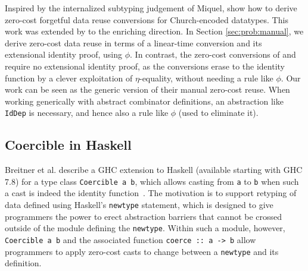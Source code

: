 \documentclass[acmsmall]{acmart}\settopmatter{}
\newcommand{\refsec}[1]{Section \ref{sec:#1}}
\newcommand{\labsec}[1]{\label{sec:#1}}
\begin{document}
Inspired by the internalized subtyping judgement of Miquel,
\citet{barras:implicit} show how to derive zero-cost forgetful data
reuse conversions for Church-encoded datatypes.
This work was extended by \citet{diehl} to the enriching direction.
In \refsec{prob:manual}, we derive zero-cost data reuse in terms of a
linear-time conversion and its extensional identity proof, using
$\phi$. In contrast, the zero-cost conversions of
\citet{barras:implicit} and \citet{diehl} require no extensional
identity proof, as the conversions erase to the identity function by a
clever exploitation of $\eta$-equality, without needing a rule like
$\phi$. Our work can be seen as the generic version of their manual
zero-cost reuse. When working generically with abstract combinator
definitions, an abstraction like \verb;IdDep; is necessary,
and hence also a rule like $\phi$ (used to eliminate it).



\subsection{Coercible in Haskell}
\labsec{others:hask}

Breitner et al. describe a GHC extension to Haskell (available
starting with GHC 7.8) for a type class \verb|Coercible a b|, which
allows casting from \verb|a| to \verb|b| when such a cast is indeed
the identity function~\cite{breitner+16}.  The motivation is to support retyping of data
defined using Haskell's \verb|newtype| statement, which is designed to
give programmers the power to erect abstraction barriers that cannot
be crossed outside of the module defining the \verb|newtype|.  Within
such a module, however, \verb|Coercible a b| and the associated
function \verb|coerce :: a -> b| allow programmers to apply zero-cost
casts to change between a \verb|newtype| and its definition.
\end{document}
